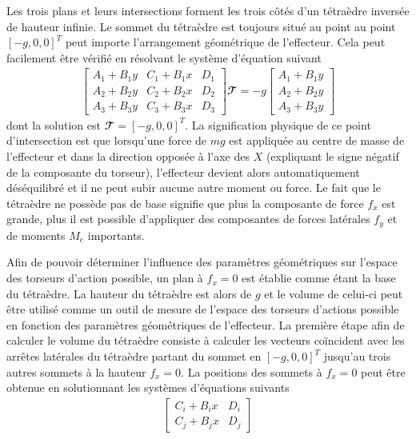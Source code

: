 
Les trois plans et leurs intersections forment les trois côtés d'un tétraèdre inversée de hauteur infinie. Le sommet du tétraèdre est toujours situé au point au point $[-g,0,0]^T$ peut importe l'arrangement géométrique de l'effecteur. Cela peut facilement être vérifié en résolvant le système d'équation suivant
\begin{align}
\begin{bmatrix}
A_1+B_1y & C_1+B_1x & D_1 \\
A_2+B_2y & C_2+B_2x & D_2 \\
A_3+B_3y & C_3+B_3x & D_3
\end{bmatrix}
\mathbfcal{T}
= -g
\begin{bmatrix}
A_1+B_1y\\
A_2+B_2y\\
A_3+B_3y
\end{bmatrix}
\end{align} dont la solution est $\mathbfcal{T} = [-g, 0, 0]^T$. La signification physique de ce point d'intersection est que lorsqu'une force de $mg$ est appliquée au centre de masse de l'effecteur et dans la direction opposée à l'axe des $X$ (expliquant le signe négatif de la composante du torseur), l'effecteur devient alors automatiquement déséquilibré et il ne peut subir aucune autre moment ou force. Le fait que le tétraèdre ne possède pas de base signifie que plus la composante de force $f_x$ est grande, plus il est possible d'appliquer des composantes de forces latérales $f_y$ et de moments $M_e$ importants. \par
Afin de pouvoir déterminer l'influence des paramètres géométriques sur l'espace des torseurs d'action possible, un plan à $f_x=0$ est établie comme étant la base du tétraèdre. La hauteur du tétraèdre est alors de $g$ et le volume de celui-ci peut être utilisé comme un outil de mesure de l'espace des torseurs d'actions possible en fonction des paramètres géométriques de l'effecteur. La première étape afin de calculer le volume du tétraèdre consiste à calculer les vecteurs coïncident avec les arrêtes latérales du tétraèdre partant du sommet en $[-g, 0, 0]^T$ jusqu'au trois autres sommets à la hauteur $f_x=0$. La positions des sommets à $f_x=0$ peut être obtenue en solutionnant les systèmes d'équations suivants
\begin{align}
\begin{bmatrix}
C_i+B_ix & D_i \\
C_j+B_jx & D_j
\end{bmatrix}
\end{align}
